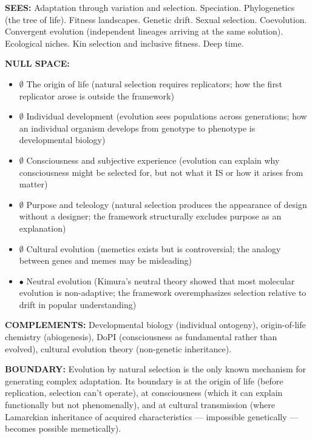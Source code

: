 \textbf{SEES:} Adaptation through variation and selection. Speciation. Phylogenetics (the tree of life). Fitness landscapes. Genetic drift. Sexual selection. Coevolution. Convergent evolution (independent lineages arriving at the same solution). Ecological niches. Kin selection and inclusive fitness. Deep time.


\textbf{NULL SPACE:}

\begin{itemize}[nosep,leftmargin=*]
  \item $\emptyset$ The origin of life (natural selection requires replicators; how the first replicator arose is outside the framework)
  \item $\emptyset$ Individual development (evolution sees populations across generations; how an individual organism develops from genotype to phenotype is developmental biology)
  \item $\emptyset$ Consciousness and subjective experience (evolution can explain why consciousness might be selected for, but not what it IS or how it arises from matter)
  \item $\emptyset$ Purpose and teleology (natural selection produces the appearance of design without a designer; the framework structurally excludes purpose as an explanation)
  \item $\emptyset$ Cultural evolution (memetics exists but is controversial; the analogy between genes and memes may be misleading)
  \item $\bullet$ Neutral evolution (Kimura's neutral theory showed that most molecular evolution is non-adaptive; the framework overemphasizes selection relative to drift in popular understanding)
\end{itemize}


\textbf{COMPLEMENTS:} Developmental biology (individual ontogeny), origin-of-life chemistry (abiogenesis), DoPI (consciousness as fundamental rather than evolved), cultural evolution theory (non-genetic inheritance).


\textbf{BOUNDARY:} Evolution by natural selection is the only known mechanism for generating complex adaptation. Its boundary is at the origin of life (before replication, selection can't operate), at consciousness (which it can explain functionally but not phenomenally), and at cultural transmission (where Lamarckian inheritance of acquired characteristics — impossible genetically — becomes possible memetically).


